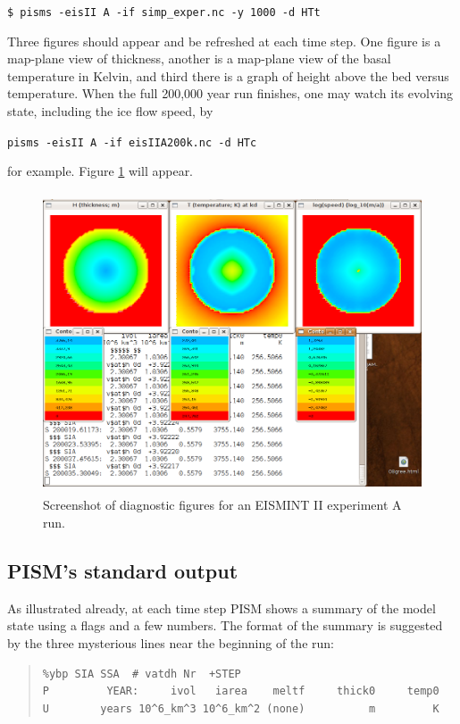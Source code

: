 \documentclass[11pt,final]{amsart}
\begin{document}
\verb|$ pisms -eisII A -if simp_exper.nc -y 1000 -d HTt|

Three figures should appear and be refreshed at each time step.  One figure is a map-plane view of thickness, another is a map-plane view of the basal temperature in Kelvin, and third there is a graph of height above the bed versus temperature.  When the full 200,000 year run finishes, one may watch its evolving state, including the ice flow speed, by

\verb|pisms -eisII A -if eisIIA200k.nc -d HTc|

\noindent for example.  Figure \ref{fig:screenshot} will appear.

\begin{figure}[ht]
\includegraphics[height=3.5in,keepaspectratio=true]{figs/eisIIAshot}
\caption{Screenshot of diagnostic figures for an EISMINT II experiment A run.}
\label{fig:screenshot}
\end{figure}

\subsection{PISM's standard output}   As illustrated already, at each time step PISM shows a summary of the model state using a flags and a few numbers.  The format of the summary is suggested by the three mysterious lines near the beginning of the run:

\small\begin{quote}\begin{verbatim}
%ybp SIA SSA  # vatdh Nr  +STEP
P         YEAR:     ivol   iarea    meltf     thick0     temp0
U        years 10^6_km^3 10^6_km^2 (none)          m         K
\end{verbatim}
\end{quote}\normalsize
\end{document}
